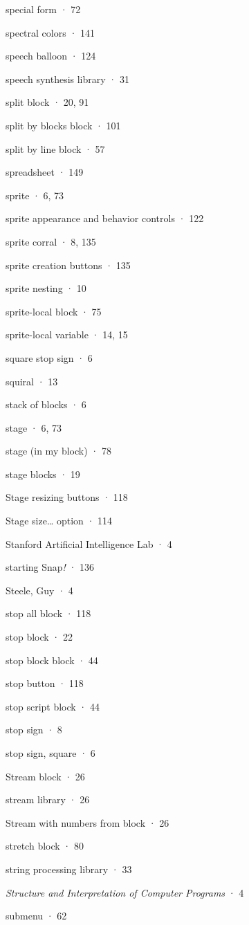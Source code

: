 \documentclass[
  letterpaper,
]{book}
\begin{document}
special form · 72

spectral colors · 141

speech balloon · 124

speech synthesis library · 31

split block · 20, 91

split by blocks block · 101

split by line block · 57

spreadsheet · 149

sprite · 6, 73

sprite appearance and behavior controls · 122

sprite corral · 8, 135

sprite creation buttons · 135

sprite nesting · 10

sprite-local block · 75

sprite-local variable · 14, 15

square stop sign · 6

squiral · 13

stack of blocks · 6

stage · 6, 73

stage (in my block) · 78

stage blocks · 19

Stage resizing buttons · 118

Stage size\ldots{} option · 114

Stanford Artificial Intelligence Lab · 4

starting Snap\emph{!} · 136

Steele, Guy · 4

stop all block · 118

stop block · 22

stop block block · 44

stop button · 118

stop script block · 44

stop sign · 8

stop sign, square · 6

Stream block · 26

stream library · 26

Stream with numbers from block · 26

stretch block · 80

string processing library · 33

\emph{Structure and Interpretation of Computer Programs} · 4

submenu · 62
\end{document}

